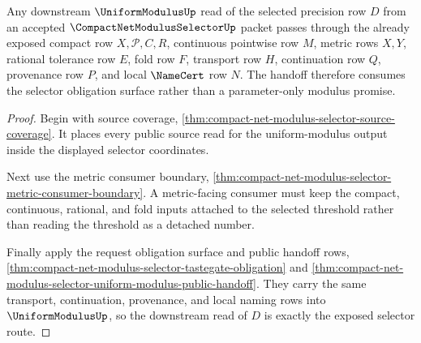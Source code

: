 \begin{theorem}
\label{thm:compact-net-modulus-selector-uniformmodulus-handoff}
Any downstream $\UniformModulusUp$ read of the selected precision row $D$ from an accepted $\CompactNetModulusSelectorUp$ packet passes through the already exposed compact row $X,\mathcal{P},C,R$, continuous pointwise row $M$, metric rows $X,Y$, rational tolerance row $E$, fold row $F$, transport row $H$, continuation row $Q$, provenance row $P$, and local $\NameCert$ row $N$. The handoff therefore consumes the selector obligation surface rather than a parameter-only modulus promise.
\end{theorem}
\begin{proof}
Begin with source coverage, \autoref{thm:compact-net-modulus-selector-source-coverage}. It places every public source read for the uniform-modulus output inside the displayed selector coordinates.

Next use the metric consumer boundary, \autoref{thm:compact-net-modulus-selector-metric-consumer-boundary}. A metric-facing consumer must keep the compact, continuous, rational, and fold inputs attached to the selected threshold rather than reading the threshold as a detached number.

Finally apply the request obligation surface and public handoff rows, \autoref{thm:compact-net-modulus-selector-tastegate-obligation} and \autoref{thm:compact-net-modulus-selector-uniform-modulus-public-handoff}. They carry the same transport, continuation, provenance, and local naming rows into $\UniformModulusUp$, so the downstream read of $D$ is exactly the exposed selector route.
\end{proof}

